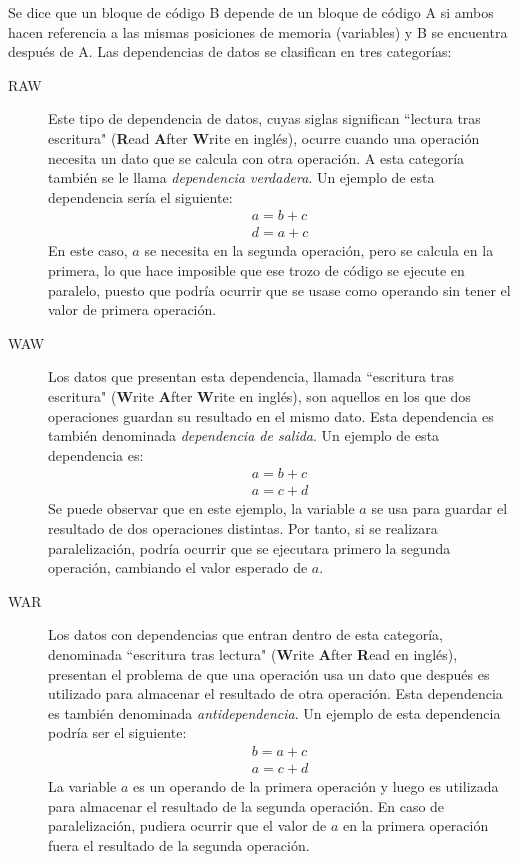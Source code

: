 \documentclass[11pt,twoside,titlepage,a4paper]{article}
\begin{document}
Se dice que un bloque de código B depende de un bloque de código A si ambos hacen referencia a las mismas
posiciones de memoria (variables) y B se encuentra después de A. Las dependencias de datos se clasifican
en tres categorías:
\begin{description}
	\item [RAW] Este tipo de dependencia de datos, cuyas siglas significan ``lectura tras escritura" 
	(\textbf Read \textbf After \textbf Write en inglés), ocurre cuando una operación necesita un dato que
	se calcula con otra operación. A esta categoría también se le llama \textit{dependencia verdadera}. Un
	ejemplo de esta dependencia sería el siguiente:
	\begin{gather*}
		a = b + c\\
		d = a + c
	\end{gather*}
	En este caso, $a$ se necesita en la segunda operación, pero se calcula en la primera, lo que
	hace imposible que ese trozo de código se ejecute en paralelo, puesto que podría ocurrir que se usase
	como operando sin tener el valor de primera operación.
	\item [WAW] Los datos que presentan esta dependencia, llamada ``escritura tras escritura" (\textbf
	Write \textbf After \textbf Write en inglés), son aquellos en los que dos operaciones guardan su
	resultado en el mismo dato. Esta dependencia es también denominada \textit{dependencia de salida}. Un
	ejemplo de esta dependencia es:
	\begin{gather*}
		a = b + c\\
		a = c + d
	\end{gather*}
	Se puede observar que en este ejemplo, la variable $a$ se usa para guardar el resultado de dos
	operaciones distintas. Por tanto, si se realizara paralelización, podría ocurrir que se ejecutara
	primero la segunda operación, cambiando el valor esperado de $a$.
	\item [WAR] Los datos con dependencias que entran dentro de esta categoría, denominada ``escritura tras
	lectura" (\textbf Write \textbf After \textbf Read en inglés), presentan el problema de que una
	operación usa un dato que después es utilizado para almacenar el resultado de otra operación. Esta
	dependencia es también denominada \textit{antidependencia}. Un ejemplo de esta dependencia podría ser
	el siguiente:
	\begin{gather*}
		b = a + c\\
		a = c + d
	\end{gather*}
	La variable $a$ es un operando de la primera operación y luego es utilizada para almacenar el
	resultado de la segunda operación. En caso de paralelización, pudiera ocurrir que el valor de $a$ en
	la primera operación fuera el resultado de la segunda operación.
\end{description}
\end{document}
